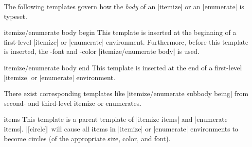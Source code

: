 \appearancenote
The following templates govern how the \emph{body} of an |itemize| or
an |enumerate| is typeset.
\begin{template}{itemize/enumerate body begin}
  This template is inserted at the beginning of a first-level
  |itemize| or |enumerate| environment. Furthermore, before this
  template is inserted, the \beamer-font and -color
  |itemize/enumerate body| is used.
\end{template}
\begin{template}{itemize/enumerate body end}
  This template is inserted at the end of a first-level
  |itemize| or |enumerate| environment.
\end{template}
There exist corresponding templates like
|itemize/enumerate subbody being| from second- and third-level itemize
or enumerates.

\begin{template}{items}
  This template is a parent template of |itemize items| and
  |enumerate items|.
  \example |[circle]| will cause all items in
  |itemize| or |enumerate| environments to become circles (of the
  appropriate size, color, and font).
\end{template}


